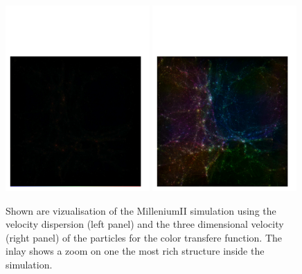 \begin{figure}
\begin{center}
\includegraphics[width=0.49\textwidth]{millenium2_veldisp.pdf}
\includegraphics[width=0.49\textwidth]{millenium2_vel.pdf}
\end{center}
\caption{Shown are vizualisation of the MilleniumII simulation \citep{2009MNRAS.398.1150B} using
the velocity dispersion (left panel) and the three dimensional velocity (right panel) of the
particles for the color transfere function. The inlay shows a zoom on one the most rich structure
inside the simulation.}\label{mil2}
\end{figure}


